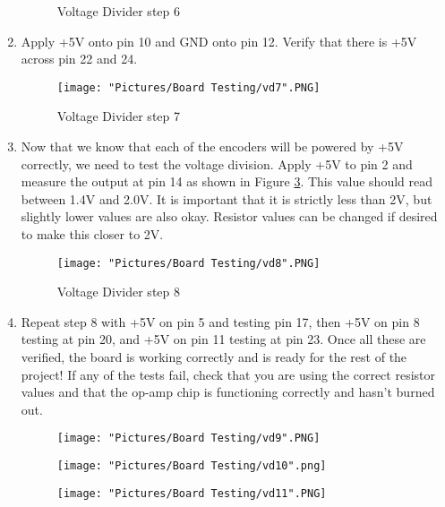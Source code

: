 \documentclass[12pt]{article}
\begin{document}
\begin{enumerate}
\begin{figure}[H]
		 	\caption{Voltage Divider step 6}
			\label{vd6}
		\end{figure}
	\item Apply +5V onto pin 10 and GND onto pin 12. Verify that there is +5V across pin 22 and 24.
		\begin{figure}[H]
		 	\centering
			\texttt{[image: "Pictures/Board Testing/vd7".PNG]}
		 	\caption{Voltage Divider step 7}
			\label{vd7}
		\end{figure}
	\item Now that we know that each of the encoders will be powered by +5V correctly, we need to test the voltage division. Apply +5V to pin 2 and measure the output at pin 14 as shown in Figure \ref{vd8}. This value should read between 1.4V and 2.0V. It is important that it is strictly less than 2V, but slightly lower values are also okay. Resistor values can be changed if desired to make this closer to 2V. 
		\begin{figure}[H]
		 	\centering
			\texttt{[image: "Pictures/Board Testing/vd8".PNG]}
		 	\caption{Voltage Divider step 8}
			\label{vd8}
		\end{figure}
	\item Repeat step 8 with +5V on pin 5 and testing pin 17, then +5V on pin 8 testing at pin 20, and +5V on pin 11 testing at pin 23. Once all these are verified, the board is working correctly and is ready for the rest of the project! If any of the tests fail, check that you are using the correct resistor values and that the op-amp chip is functioning correctly and hasn't burned out.  

	\begin{figure}[H]
	 	\centering
	  	\begin{minipage}[b]{0.45\textwidth}
			\texttt{[image: "Pictures/Board Testing/vd9".PNG]}
	  	\end{minipage}
	  	\hfill
	  	\begin{minipage}[b]{0.45\textwidth}
	    		\texttt{[image: "Pictures/Board Testing/vd10".png]}
	  	\end{minipage}
		\label{}
	\end{figure}


		\begin{figure}[H]
		 	\centering
			\texttt{[image: "Pictures/Board Testing/vd11".PNG]}
		 	\caption{}
			\label{vd11}
		\end{figure}

\end{enumerate}
\end{document}
